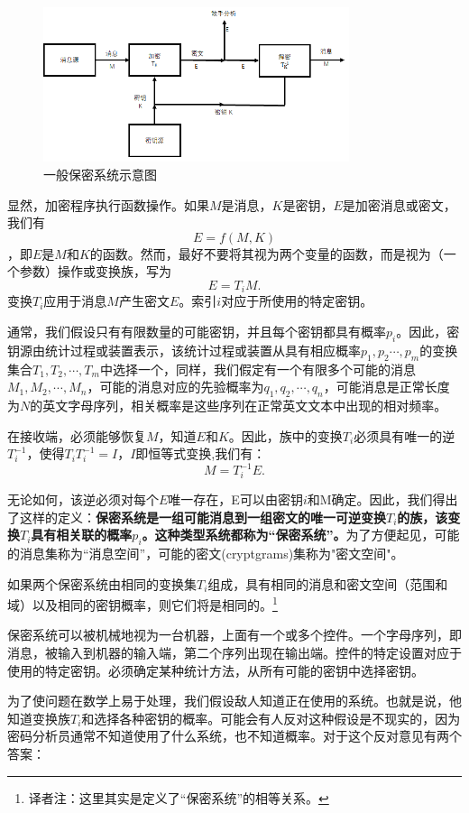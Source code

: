 \documentclass[]{article}
\begin{document}
\begin{figure}[htbp]
	\centering
	\includegraphics[width=0.8\textwidth]{general-secrecy-system.png}
	\caption{一般保密系统示意图}
	\label{Fig:fig1}
\end{figure}

显然，加密程序执行函数操作。如果$M$是消息，$K$是密钥，$E$是加密消息或密文，我们有\[E=f(M,K)\]，即$E$是$M$和$K$的函数。然而，最好不要将其视为两个变量的函数，而是视为（一个参数）操作或变换族，写为\[E=T_iM.\]
变换$T_i$应用于消息$M$产生密文$E$。索引$i$对应于所使用的特定密钥。

通常，我们假设只有有限数量的可能密钥，并且每个密钥都具有概率$p_i$。因此，密钥源由统计过程或装置表示，该统计过程或装置从具有相应概率$p_1,p_2\cdots,p_m$的变换集合$T_1,T_2,\cdots,T_m$中选择一个，同样，我们假定有一个有限多个可能的消息$M_1,M_2,\cdots,M_n$，可能的消息对应的先验概率为$q_1,q_2,\cdots,q_n$，可能消息是正常长度为$N$的英文字母序列，相关概率是这些序列在正常英文文本中出现的相对频率。

在接收端，必须能够恢复$M$，知道$E$和$K$。因此，族中的变换$T_i$必须具有唯一的逆$T^{-1}_i$，使得$T_iT^{-1}_i=I$，$I$即恒等式变换,我们有：\[M=T^{-1}_i E.\]

无论如何，该逆必须对每个$E$唯一存在，E可以由密钥$i$和M确定。因此，我们得出了这样的定义：\textbf{保密系统是一组可能消息到一组密文的唯一可逆变换$T_i$的族，该变换$T_i$具有相关联的概率$p_i$。这种类型系统都称为“保密系统”。}为了方便起见，可能的消息集称为“消息空间”，可能的密文(cryptgrams)集称为"密文空间"。

如果两个保密系统由相同的变换集$T_i$组成，具有相同的消息和密文空间（范围和域）以及相同的密钥概率，则它们将是相同的。\footnote{译者注：这里其实是定义了“保密系统”的相等关系。}

保密系统可以被机械地视为一台机器，上面有一个或多个控件。一个字母序列，即消息，被输入到机器的输入端，第二个序列出现在输出端。控件的特定设置对应于使用的特定密钥。必须确定某种统计方法，从所有可能的密钥中选择密钥。

为了使问题在数学上易于处理，我们假设敌人知道正在使用的系统。也就是说，他知道变换族$T_i$和选择各种密钥的概率。可能会有人反对这种假设是不现实的，因为密码分析员通常不知道使用了什么系统，也不知道概率。对于这个反对意见有两个答案：
\end{document}
